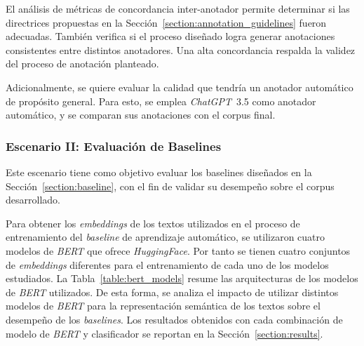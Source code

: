 El an\'alisis de m\'etricas de concordancia inter-anotador permite determinar si las directrices propuestas en la 
Secci\'on~\ref{section:annotation_guidelines} fueron adecuadas. Tambi\'en verifica si el proceso dise\~nado logra generar
anotaciones consistentes entre distintos anotadores. Una alta concordancia respalda la validez del proceso de anotaci\'on
planteado.

Adicionalmente, se quiere evaluar la calidad que tendr\'ia un anotador autom\'atico de prop\'osito general. Para esto, se 
emplea \emph{ChatGPT}~3.5 como anotador autom\'atico, y se comparan sus anotaciones con el corpus final.

\subsubsection{Escenario II: Evaluaci\'on de Baselines}\label{subsection:scenery2}
Este escenario tiene como objetivo evaluar los baselines dise\~nados en la Secci\'on~\ref{section:baseline}, con el fin de 
validar su desempe\~no sobre el corpus desarrollado.

Para obtener los \emph{embeddings} de los textos utilizados en el proceso de entrenamiento del \emph{baseline} 
de aprendizaje autom\'atico, se utilizaron cuatro modelos de \emph{BERT} que ofrece \emph{HuggingFace}.
Por tanto se tienen cuatro conjuntos de \emph{embeddings} diferentes para el entrenamiento de cada uno de 
los modelos estudiados. La Tabla~\ref{table:bert_models} resume las arquitecturas de los modelos de \emph{BERT} utilizados.
De esta forma, se analiza el impacto de utilizar distintos modelos de \emph{BERT} para la representaci\'on 
sem\'antica de los textos sobre el desempe\~no de los \emph{baselines}. Los resultados obtenidos con cada 
combinaci\'on de modelo de \emph{BERT} y clasificador se reportan en la Secci\'on~\ref{section:results}.

\begin{table}[htpb]
    \centering
    \caption{Arquitecturas de modelos de \emph{BERT} utilizados.}
    \label{table:bert_models}
\end{table}

